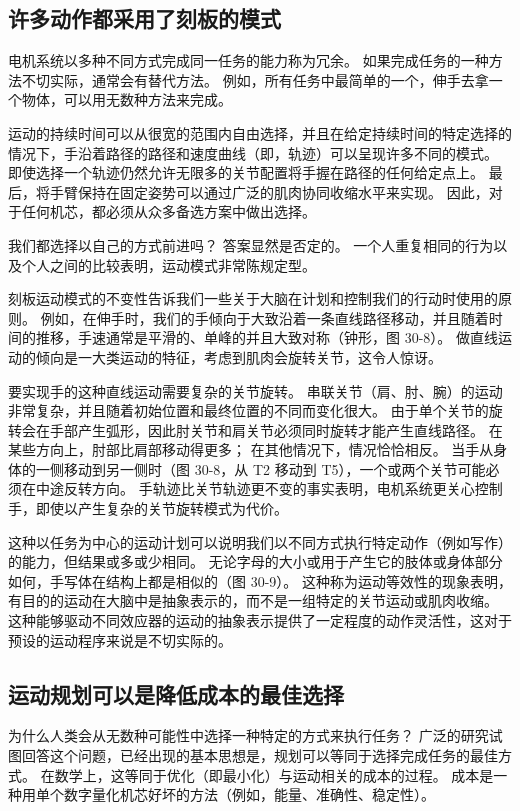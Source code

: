\subsection{许多动作都采用了刻板的模式}

电机系统以多种不同方式完成同一任务的能力称为冗余。 如果完成任务的一种方法不切实际，通常会有替代方法。 例如，所有任务中最简单的一个，伸手去拿一个物体，可以用无数种方法来完成。

运动的持续时间可以从很宽的范围内自由选择，并且在给定持续时间的特定选择的情况下，手沿着路径的路径和速度曲线（即，轨迹）可以呈现许多不同的模式。 即使选择一个轨迹仍然允许无限多的关节配置将手握在路径的任何给定点上。 最后，将手臂保持在固定姿势可以通过广泛的肌肉协同收缩水平来实现。 因此，对于任何机芯，都必须从众多备选方案中做出选择。

我们都选择以自己的方式前进吗？ 答案显然是否定的。 一个人重复相同的行为以及个人之间的比较表明，运动模式非常陈规定型。

刻板运动模式的不变性告诉我们一些关于大脑在计划和控制我们的行动时使用的原则。 例如，在伸手时，我们的手倾向于大致沿着一条直线路径移动，并且随着时间的推移，手速通常是平滑的、单峰的并且大致对称（钟形，图 30-8）。 做直线运动的倾向是一大类运动的特征，考虑到肌肉会旋转关节，这令人惊讶。

要实现手的这种直线运动需要复杂的关节旋转。 串联关节（肩、肘、腕）的运动非常复杂，并且随着初始位置和最终位置的不同而变化很大。 由于单个关节的旋转会在手部产生弧形，因此肘关节和肩关节必须同时旋转才能产生直线路径。 在某些方向上，肘部比肩部移动得更多； 在其他情况下，情况恰恰相反。 当手从身体的一侧移动到另一侧时（图 30-8，从 T2 移动到 T5），一个或两个关节可能必须在中途反转方向。 手轨迹比关节轨迹更不变的事实表明，电机系统更关心控制手，即使以产生复杂的关节旋转模式为代价。

这种以任务为中心的运动计划可以说明我们以不同方式执行特定动作（例如写作）的能力，但结果或多或少相同。 无论字母的大小或用于产生它的肢体或身体部分如何，手写体在结构上都是相似的（图 30-9）。 这种称为运动等效性的现象表明，有目的的运动在大脑中是抽象表示的，而不是一组特定的关节运动或肌肉收缩。 这种能够驱动不同效应器的运动的抽象表示提供了一定程度的动作灵活性，这对于预设的运动程序来说是不切实际的。



\subsection{运动规划可以是降低成本的最佳选择}
为什么人类会从无数种可能性中选择一种特定的方式来执行任务？ 广泛的研究试图回答这个问题，已经出现的基本思想是，规划可以等同于选择完成任务的最佳方式。 在数学上，这等同于优化（即最小化）与运动相关的成本的过程。 成本是一种用单个数字量化机芯好坏的方法（例如，能量、准确性、稳定性）。

